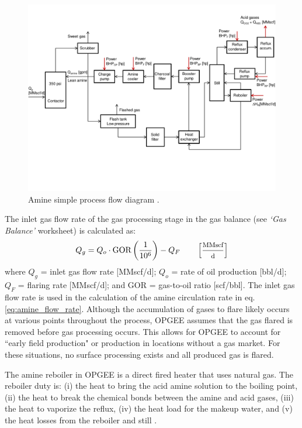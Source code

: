 \documentclass[11pt]{report}
\newcommand{\marg}[1]{{\footnotesize\textit{\textcolor{stanford}{'#1'}}}}
\newcommand{\marginnote}[1]{\marginpar{\marg{#1}}}
\newcommand{\sheet}[1]{\textit{`{#1}'}}
\begin{document}
\begin{landscape}
\begin{figure}[t]
\includegraphics[width=0.85\columnwidth]{images/Amine_process.pdf}
\caption{Amine simple process flow diagram \cite[p. 112]{Manning1991}.}
\label{fig:amine_process}
\end{figure}
\end{landscape}
   

The inlet gas flow rate of the gas processing stage in the gas balance (see \sheet{Gas Balance} worksheet) is calculated as:  \marginnote{Surface \\ Processing 2.2.1 Figure}
\begin{equation} \label{eq:AGR_inlet_gas}
Q_{g}= Q_{o} \cdot \text{GOR}  \left( \frac{1}{10^6} \right) - Q_{F} \quad \quad \begin{footnotesize}\left[  \frac{\text{MMscf}}{\text{d}} \right] \end{footnotesize}
\end{equation}
where $Q_{g}$ = inlet gas flow rate [MMscf/d]; $Q_{o}$ = rate of oil production [bbl/d]; $Q_{F}$ = flaring rate [MMscf/d]; and GOR = gas-to-oil ratio [scf/bbl]. The inlet gas flow rate is used in the calculation of the amine circulation rate in eq.\,\eqref{eq:amine_flow_rate}. Although the accumulation of gases to flare likely occurs at various points throughout the process, OPGEE assumes that the gas flared is removed before gas processing occurs. This allows for OPGEE to account for ``early field production" or production in locations without a gas market. For these situations, no surface processing exists and all produced gas is flared.  

The amine reboiler in OPGEE is a direct fired heater that uses natural gas. The reboiler duty is: (i) the heat to bring the acid amine solution to the boiling point, (ii) the heat to break the chemical bonds between the amine and acid gases, (iii) the heat to vaporize the reflux, (iv) the heat load for the makeup water, and (v) the heat losses from the reboiler and still \cite[p. 117]{Manning1991}.
\end{document}

